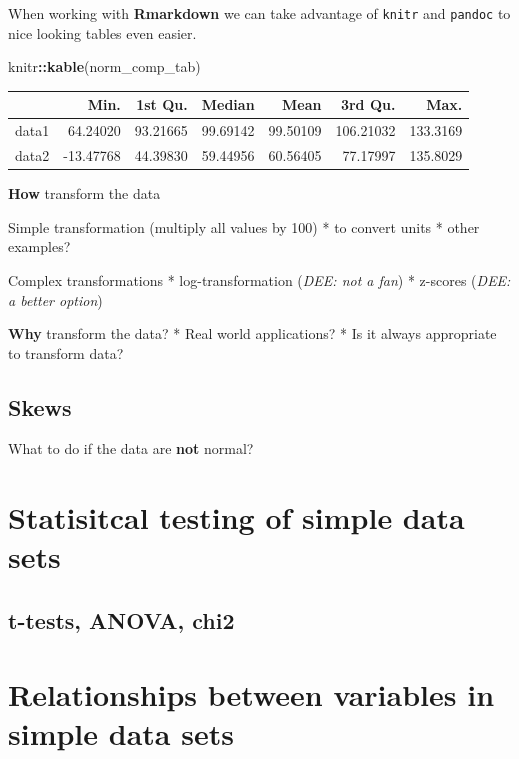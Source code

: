 \documentclass[
]{book}
\newenvironment{Shaded}{\begin{snugshade}}{\end{snugshade}}
\newcommand{\FunctionTok}[1]{\textcolor[rgb]{0.13,0.29,0.53}{\textbf{#1}}}
\newcommand{\NormalTok}[1]{#1}
\newcommand{\SpecialCharTok}[1]{\textcolor[rgb]{0.81,0.36,0.00}{\textbf{#1}}}
\begin{document}
When working with \textbf{Rmarkdown} we can take advantage of \texttt{knitr} and \texttt{pandoc} to nice looking tables even easier.

\begin{Shaded}
\begin{Highlighting}[]
\NormalTok{knitr}\SpecialCharTok{::}\FunctionTok{kable}\NormalTok{(norm\_comp\_tab)}
\end{Highlighting}
\end{Shaded}

\begin{tabular}{l|r|r|r|r|r|r}
\hline
  & Min. & 1st Qu. & Median & Mean & 3rd Qu. & Max.\\
\hline
data1 & 64.24020 & 93.21665 & 99.69142 & 99.50109 & 106.21032 & 133.3169\\
\hline
data2 & -13.47768 & 44.39830 & 59.44956 & 60.56405 & 77.17997 & 135.8029\\
\hline
\end{tabular}

\textbf{How} transform the data

Simple transformation (multiply all values by 100)
* to convert units
* other examples?

Complex transformations
* log-transformation (\emph{DEE: not a fan})
* z-scores (\emph{DEE: a better option})

\textbf{Why} transform the data?
* Real world applications?
* Is it always appropriate to transform data?

\hypertarget{skews}{%
\subsection{Skews}\label{skews}}

What to do if the data are \textbf{not} normal?

\hypertarget{statisitcal-testing-of-simple-data-sets}{%
\section{Statisitcal testing of simple data sets}\label{statisitcal-testing-of-simple-data-sets}}

\hypertarget{t-tests-anova-chi2}{%
\subsection{t-tests, ANOVA, chi2}\label{t-tests-anova-chi2}}

\hypertarget{relationships-between-variables-in-simple-data-sets}{%
\section{Relationships between variables in simple data sets}\label{relationships-between-variables-in-simple-data-sets}}
\end{document}
